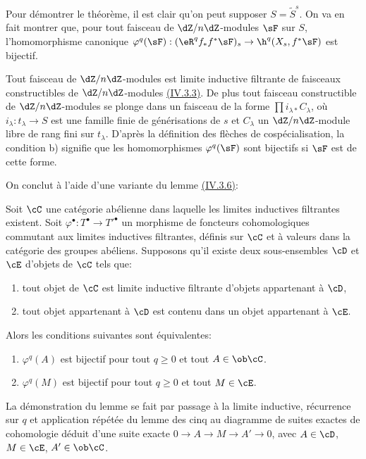 Pour démontrer le théorème, il est clair qu'on peut supposer 
$S=\widetilde S^s$. On va en fait montrer que, pour tout faisceau de 
$\dZ/n\dZ$-modules $\sF$ sur $S$, l'homomorphisme canonique 
$\varphi^q(\sF):(\eR^q f_* f^* \sF)_s \to \h^q(X_s,f^*\sF)$ est bijectif. 

Tout faisceau de $\dZ/n\dZ$-modules est limite inductive filtrante de faisceaux 
constructibles de $\dZ/n\dZ$-modules \hyperref[I:4-3-3]{(IV.3.3)}. De plus tout faisceau 
constructible de $\dZ/n\dZ$-modules se plonge dans un faisceau de la forme 
$\prod i_{\lambda *} C_\lambda$, où $i_\lambda:t_\lambda\to S$ est une 
famille finie de générisations de $s$ et $C_\lambda$ un $\dZ/n\dZ$-module 
libre de rang fini sur $t_\lambda$. D'après la définition des flèches de 
cospécialisation, la condition b) signifie que les homomorphismes 
$\varphi^q(\sF)$ sont bijectifs si $\sF$ est de cette forme. 

On conclut à l'aide d'une variante du lemme \hyperref[I:4-3-6]{(IV.3.6)}:





\begin{lemmadotdash}\label{I:5-1-8}
Soit $\cC$ une catégorie abélienne dans laquelle les limites inductives 
filtrantes existent. Soit $\varphi^\bullet:T^\bullet\to{T'}^\bullet$ un 
morphisme de foncteurs cohomologiques commutant aux limites inductives 
filtrantes, définis sur $\cC$ et à valeurs dans la catégorie des groupes 
abéliens. Supposons qu'il existe deux sous-ensembles $\cD$ et $\cE$ d'objets 
de $\cC$ tels que:
\begin{enumerate}[\indent a)]
  \item tout objet de $\cC$ est limite inductive filtrante d'objets appartenant 
    à $\cD$, 
  \item tout objet appartenant à $\cD$ est contenu dans un objet appartenant 
    à $\cE$.
\end{enumerate}

Alors les conditions suivantes sont équivalentes: 
\begin{enumerate}[\indent (i)]
  \item $\varphi^q(A)$ est bijectif pour tout $q\geqslant 0$ et tout 
    $A\in\ob\cC$.
  \item $\varphi^q(M)$ est bijectif pour tout $q\geqslant 0$ et tout $M\in\cE$. 
\end{enumerate}
\end{lemmadotdash}

La démonstration du lemme se fait par passage à la limite inductive, 
récurrence sur $q$ et application répétée du lemme des cinq au diagramme 
de suites exactes de cohomologie déduit d'une suite exacte 
$0\to A\to M\to A'\to 0$, avec $A\in\cD$, $M\in\cE$, $A'\in \ob\cC$. 





